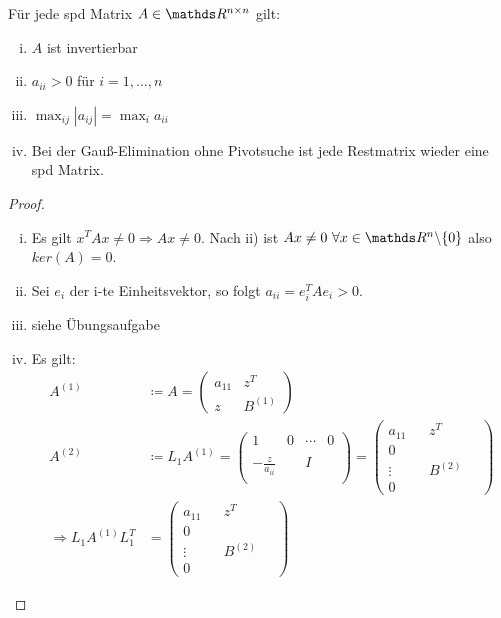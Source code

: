 \begin{Satze}
	\label{4.2.1}
	Für jede spd Matrix $A\in \Renn $ gilt:
	\begin{enumerate}[i)]	
		\item $A$ ist invertierbar
		\item $a_{ii}>0$ für $i=1, \dots , n$
		\item $\max_{ij}|a_{ij}| = \max_{i}a_{ii}$
		\item Bei der Gauß-Elimination ohne Pivotsuche ist jede Restmatrix wieder eine spd Matrix.
	\end{enumerate}
\end{Satze}

\begin{proof}~
	\begin{enumerate}[i)]
		\item Es gilt $x^TAx\neq 0\Rightarrow Ax\neq 0$. 
		Nach ii) ist $Ax\neq 0~\forall x\in\Ren\backslash \{0\}$
		also $ker(A)=0$. %
		\item Sei $e_i$ der i-te Einheitsvektor, so folgt $a_{ii} = e_{i}^TAe_i > 0$.
		\item siehe Übungsaufgabe
		\item Es gilt:
		\begin{align*}
		A^{(1)} &\coloneqq A = \begin{pmatrix}
		a_{11} & z^T \\ 
		z			& B^{(1)}
		\end{pmatrix} \\
		A^{(2)}	&\coloneqq L_1 A^{(1)} 
		= \begin{pmatrix}
		1 & 0 & \dotsm & 0 \\ \\
		-\frac{z}{a_{ii}} && I \\ ~
		\end{pmatrix} 
		= \begin{pmatrix}
		a_{11} &  & z^T & ~ \\ 
		0 \\
		\vdots && B^{(2)} \\ 
		0
		\end{pmatrix} \\
		\Rightarrow L_1A^{(1)}L_1^T  
		&= \begin{pmatrix}
		a_{11} &  & z^T & ~ \\ 
		0 \\
		\vdots && B^{(2)} \\ 
		0
		\end{pmatrix} 

\end{align*}
\end{enumerate}
\end{proof}

